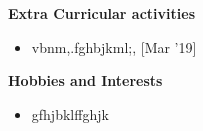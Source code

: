 \documentclass[a4paper,10pt]{article}
\begin{document}
\colorbox{titleColor}{\parbox{6.7in}{\textbf{Extra Curricular activities}}}

\begin{itemize}

    \setlength{\itemsep}{1pt}
\item vbnm,.fghbjkml;, \hfill {\small{{[Mar '19]}}\/}
\end{itemize}

\colorbox{titleColor}{\parbox{6.7in}{\textbf{Hobbies and Interests}}}

\begin{itemize}
        \setlength{\itemsep}{1pt}
\item gfhjbklffghjk
\end{itemize}
\end{document}
